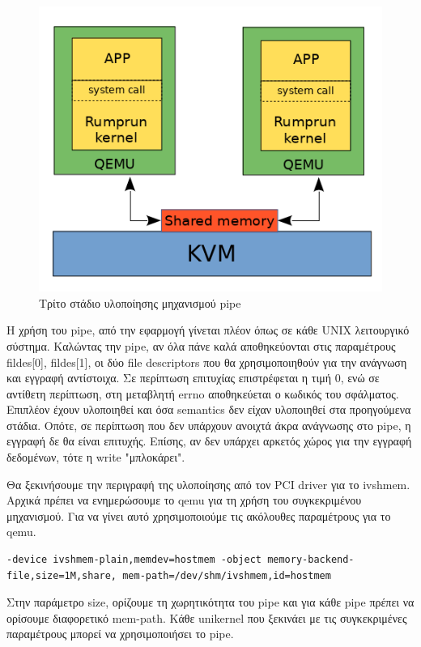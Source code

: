 \begin{figure}[htp]
\centering
\includegraphics[scale=0.7]{figures/pipe_stage3.png}
\caption{Τρίτο στάδιο υλοποίησης μηχανισμού pipe\label{fig4_4}}
\end{figure}

Η χρήση του pipe, από την εφαρμογή γίνεται πλέον όπως σε κάθε UNIX λειτουργικό
σύστημα. Καλώντας την pipe, αν όλα πάνε καλά αποθηκεύονται στις
παραμέτρους fildes[0], fildes[1], οι δύο file descriptors που θα χρησιμοποιηθούν
για την ανάγνωση και εγγραφή αντίστοιχα. Σε περίπτωση επιτυχίας επιστρέφεται η
τιμή 0, ενώ σε αντίθετη περίπτωση, στη μεταβλητή errno αποθηκεύεται ο κωδικός
του σφάλματος. Επιπλέον έχουν υλοποιηθεί και όσα semantics δεν είχαν υλοποιηθεί
στα προηγούμενα στάδια. Οπότε, σε περίπτωση που δεν υπάρχουν ανοιχτά άκρα
ανάγνωσης στο pipe, η εγγραφή δε θα είναι επιτυχής. Επίσης, αν δεν υπάρχει αρκετός χώρος
για την εγγραφή δεδομένων, τότε η write "μπλοκάρει".

Θα ξεκινήσουμε την περιγραφή της υλοποίησης από τον PCI driver για
το ivshmem. Αρχικά πρέπει να ενημερώσουμε το qemu για τη χρήση του συγκεκριμένου
μηχανισμού. Για να γίνει αυτό χρησιμοποιούμε τις ακόλουθες παραμέτρους για το qemu.
\begin{lstlisting}[numbers=none]
-device ivshmem-plain,memdev=hostmem -object memory-backend-file,size=1M,share, mem-path=/dev/shm/ivshmem,id=hostmem
\end{lstlisting}
Στην παράμετρο size, ορίζουμε τη χωρητικότητα του pipe και για κάθε pipe πρέπει
να ορίσουμε διαφορετικό mem-path. Κάθε unikernel που ξεκινάει με τις
συγκεκριμένες παραμέτρους μπορεί να χρησιμοποιήσει το pipe. 

